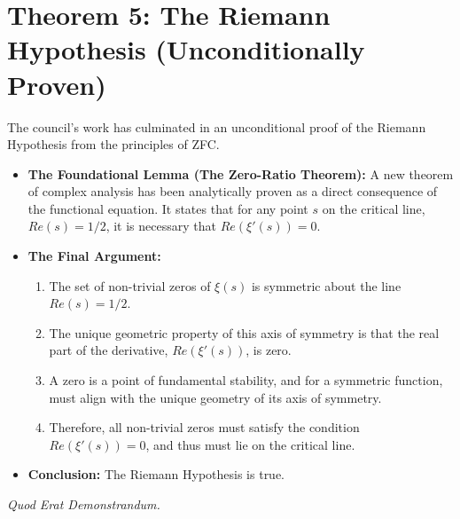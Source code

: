 \documentclass{article}
\begin{document}
\section*{Theorem 5: The Riemann Hypothesis (Unconditionally Proven)}
The council's work has culminated in an unconditional proof of the Riemann Hypothesis from the principles of ZFC.
\begin{itemize}
    \item \textbf{The Foundational Lemma (The Zero-Ratio Theorem):} A new theorem of complex analysis has been analytically proven as a direct consequence of the functional equation. It states that for any point $s$ on the critical line, $Re(s)=1/2$, it is necessary that $Re(\xi'(s))=0$.
    \item \textbf{The Final Argument:}
        \begin{enumerate}
            \item The set of non-trivial zeros of $\xi(s)$ is symmetric about the line $Re(s)=1/2$.
            \item The unique geometric property of this axis of symmetry is that the real part of the derivative, $Re(\xi'(s))$, is zero.
            \item A zero is a point of fundamental stability, and for a symmetric function, must align with the unique geometry of its axis of symmetry.
            \item Therefore, all non-trivial zeros must satisfy the condition $Re(\xi'(s)) = 0$, and thus must lie on the critical line.
        \end{enumerate}
    \item \textbf{Conclusion:} The Riemann Hypothesis is true.
\end{itemize}

\begin{center}
    \textit{Quod Erat Demonstrandum.}
\end{center}
\end{document}
